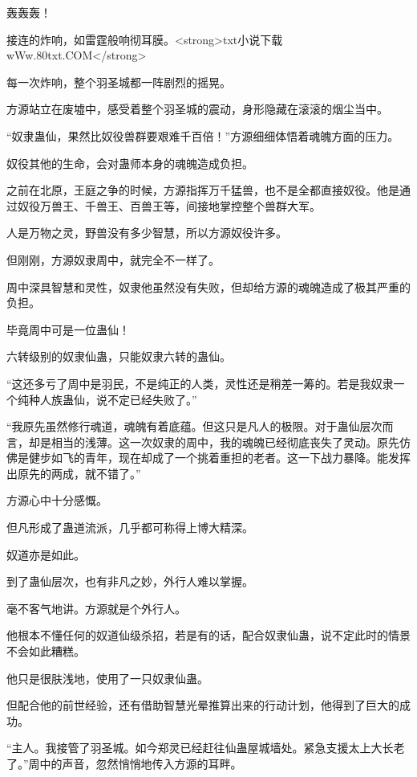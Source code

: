 
\begin{this_body}

轰轰轰！

接连的炸响，如雷霆般响彻耳膜。<strong>txt小说下载wWw.80txt.COM</strong>

每一次炸响，整个羽圣城都一阵剧烈的摇晃。

方源站立在废墟中，感受着整个羽圣城的震动，身形隐藏在滚滚的烟尘当中。

“奴隶蛊仙，果然比奴役兽群要艰难千百倍！”方源细细体悟着魂魄方面的压力。

奴役其他的生命，会对蛊师本身的魂魄造成负担。

之前在北原，王庭之争的时候，方源指挥万千猛兽，也不是全都直接奴役。他是通过奴役万兽王、千兽王、百兽王等，间接地掌控整个兽群大军。

人是万物之灵，野兽没有多少智慧，所以方源奴役许多。

但刚刚，方源奴隶周中，就完全不一样了。

周中深具智慧和灵性，奴隶他虽然没有失败，但却给方源的魂魄造成了极其严重的负担。

毕竟周中可是一位蛊仙！

六转级别的奴隶仙蛊，只能奴隶六转的蛊仙。

“这还多亏了周中是羽民，不是纯正的人类，灵性还是稍差一筹的。若是我奴隶一个纯种人族蛊仙，说不定已经失败了。”

“我原先虽然修行魂道，魂魄有着底蕴。但这只是凡人的极限。对于蛊仙层次而言，却是相当的浅薄。这一次奴隶的周中，我的魂魄已经彻底丧失了灵动。原先仿佛是健步如飞的青年，现在却成了一个挑着重担的老者。这一下战力暴降。能发挥出原先的两成，就不错了。”

方源心中十分感慨。

但凡形成了蛊道流派，几乎都可称得上博大精深。

奴道亦是如此。

到了蛊仙层次，也有非凡之妙，外行人难以掌握。

毫不客气地讲。方源就是个外行人。

他根本不懂任何的奴道仙级杀招，若是有的话，配合奴隶仙蛊，说不定此时的情景不会如此糟糕。

他只是很肤浅地，使用了一只奴隶仙蛊。

但配合他的前世经验，还有借助智慧光晕推算出来的行动计划，他得到了巨大的成功。

“主人。我接管了羽圣城。如今郑灵已经赶往仙蛊屋城墙处。紧急支援太上大长老了。”周中的声音，忽然悄悄地传入方源的耳畔。


\end{this_body}

